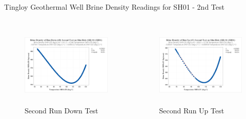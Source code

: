 \begin{frame}{Tingloy Geothermal Well Brine Density Readings for SH01 - 2nd Test\cite{halcon2015detailed}}
    \begin{columns}
    \begin{figure}
        \centering
        \caption{\centering Second Run Down Test}
        \includegraphics[height=4cm]{images/sh01r2d.png}
    \end{figure}
    \begin{figure}
        \centering
        \caption{\centering Second Run Up Test}
        \includegraphics[height=4cm]{images/sh01r2u.png}
    \end{figure}
    \end{columns}
\end{frame}

